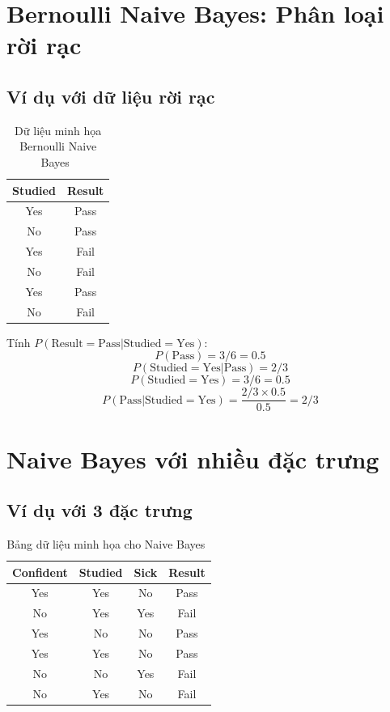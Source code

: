 \section{Bernoulli Naive Bayes: Phân loại rời rạc}

\subsection{Ví dụ với dữ liệu rời rạc}

\begin{table}[H]
\centering
\begin{tabular}{|c|c|}
\hline
\textbf{Studied} & \textbf{Result} \\
\hline
Yes & Pass \\
No & Pass \\
Yes & Fail \\
No & Fail \\
Yes & Pass \\
No & Fail \\
\hline
\end{tabular}
\caption{Dữ liệu minh họa Bernoulli Naive Bayes~\cite{aivietnam2025}}
\end{table}

Tính $P(\text{Result} = \text{Pass} | \text{Studied} = \text{Yes})$:
\[
P(\text{Pass}) = 3/6 = 0.5
\]
\[
P(\text{Studied} = \text{Yes} | \text{Pass}) = 2/3
\]
\[
P(\text{Studied} = \text{Yes}) = 3/6 = 0.5
\]
\[
P(\text{Pass}|\text{Studied} = \text{Yes}) = \frac{2/3 \times 0.5}{0.5} = 2/3
\]

\section{Naive Bayes với nhiều đặc trưng}

\subsection{Ví dụ với 3 đặc trưng}

\begin{table}[H]
\centering
\begin{tabular}{|c|c|c|c|}
\hline
\textbf{Confident} & \textbf{Studied} & \textbf{Sick} & \textbf{Result} \\
\hline
Yes & Yes & No & Pass \\
No & Yes & Yes & Fail \\
Yes & No & No & Pass \\
Yes & Yes & No & Pass \\
No & No & Yes & Fail \\
No & Yes & No & Fail \\
\hline
\end{tabular}
\caption{Bảng dữ liệu minh họa cho Naive Bayes~\cite{aivietnam2025}}
\end{table}

